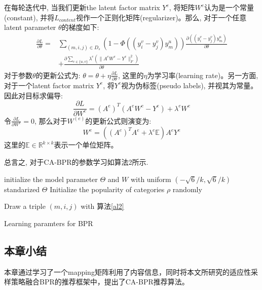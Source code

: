在每轮迭代中, 当我们更新the latent factor matrix $Y^e$, 将矩阵$W^e$认为是一个常量(constant), 并将$L_{content}$视作一个正则化矩阵(regularizer)。那么, 对于一个任意latent parameter $\theta$的梯度如下:
\begin{equation}
\begin{split}
\frac{\partial L}{\partial\theta} = 
& \sum_{\left(m,i,j\right) \in D_s}\left(1-\Phi\left(\left(y_i^v-y_j^v\right)y_m^u\right)\right) 
\frac{\partial \left(\left(y_i^v-y_j^v\right)y_m^u\right)}{\partial \theta}\\
& + \frac{\partial \sum_{e \in \{u,v\} } \lambda^e \left(\|A^eW^e-Y^e\|_F^2\right)}{\partial \theta}
\end{split}
\end{equation}
对于参数$\theta$的更新公式为: $\theta = \theta + \eta \frac{\partial L}{\partial \theta}$, 这里的$\eta$为学习率(learning rate)。另一方面, 对于一个latent factor matrix $Y^e$, 将$Y^e$视为伪标签(pseudo labels), 并视其为常量。因此对目标求偏导:
\begin{equation}
\frac{\partial L}{\partial W^e} = \left(A^e\right)^T\left(A^eW^e-Y^e\right) + \lambda^e W^e
\end{equation} 
令$\frac{\partial L}{\partial W^e} = 0$, 那么对于$W^{\left(e\right)}$的更新公式则演变为:
\begin{equation}
W^e = \left(\left(A^e\right)^TA^e + \lambda^e\mathbb{E}\right)A^eY^e
\end{equation}
这里的$\mathbb{E} \in \mathbb{R}^{k\times k}$表示一个单位矩阵。

总言之, 对于CA-BPR的参数学习如算法2所示.
\IncMargin{1em}
\begin{algorithm}
	\SetAlgoNoLine %
	
	
	\BlankLine
	initialize the model parameter $\Theta$ and $W$ with uniform $\left(-\sqrt{6}/{k},\sqrt{6}/{k}\right)$\;
	standarized $\Theta$\;
	Initialize the popularity of categories $\rho$ randomly\;
	\Repeat
		{}
		{Draw a triple $\left(m,i,j\right)$ with 算法\ref{al2}\;
			
		}
		
		
	\caption{Learning paramters for BPR\label{al3}}
	
\end{algorithm}
\DecMargin{1em}

\subsection{本章小结}
本章通过学习了一个mapping矩阵利用了内容信息，同时将本文所研究的适应性采样策略融合BPR的推荐框架中，提出了CA-BPR推荐算法。